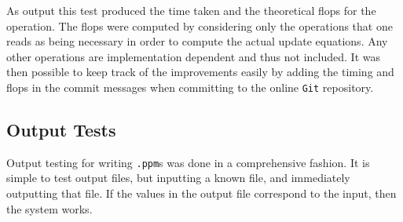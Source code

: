 As output this test produced the time taken and the theoretical flops for the operation.
The flops were computed by considering only the operations that one reads as being necessary in order to compute the actual update equations.
Any other operations are implementation dependent and thus not included.
It was then possible to keep track of the improvements easily by adding the timing and flops in the commit messages when committing to the online \texttt{Git} repository.

\subsection{Output Tests}
	Output testing for writing \texttt{.ppm}s was done in a comprehensive fashion.
	It is simple to test output files, but inputting a known file, and immediately outputting that file.
	If the values in the output file correspond to the input, then the system works.

